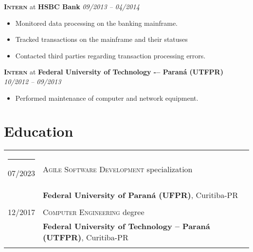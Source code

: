 \documentclass[a4paper,12pt]{article}
\begin{document}
\textbf{\textsc{Intern}} at \textbf{HSBC Bank} \hfill \textit{09/2013 -- 04/2014}
{\small
\begin{itemize}[leftmargin=*,label=\large\textbullet]
    \setlength\itemsep{-0.2em}
    \item Monitored data processing on the banking mainframe.
    \item Tracked transactions on the mainframe and their statuses
    \item Contacted third parties regarding transaction processing errors.
\end{itemize}
}

\textbf{\textsc{Intern}} at \textbf{Federal University of Technology -– Paraná (UTFPR)} \hfill \textit{10/2012 -- 09/2013}
{\small
\begin{itemize}[leftmargin=*,label=\large\textbullet]
    \setlength\itemsep{-0.2em}
    \item Performed maintenance of computer and network equipment.
\end{itemize}
}

\section{Education}
\vspace{6pt}
\begin{tabular}{rl}

\rule{2cm}{0pt} 07/2023 & \textsc{Agile Software Development} specialization \\ &\normalsize\textbf{Federal University of Paraná (UFPR)}, Curitiba-PR\\&\\
12/2017 & \textsc{Computer Engineering} degree \\ &\normalsize\textbf{Federal University of Technology – Paraná (UTFPR)}, Curitiba-PR\\&\\
\end{tabular}
\end{document}
